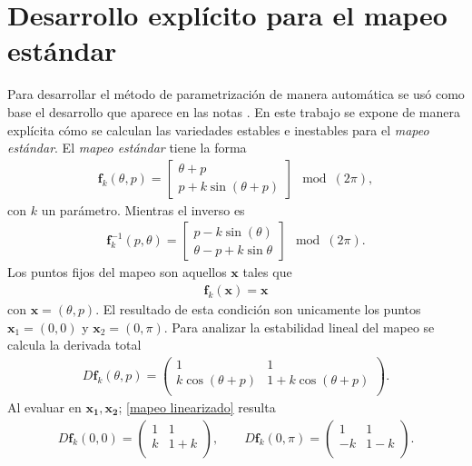 \section{Desarrollo explícito para el mapeo estándar}
Para desarrollar el método de parametrización de manera automática se usó como base el desarrollo que aparece en las notas \cite{Mireles}. En este trabajo se expone de manera explícita cómo se calculan las variedades estables e inestables para el \textit{mapeo estándar}. El \textit{mapeo estándar} tiene la forma \citep{devaney}
\begin{eqnarray}
\mathbf{f}_{k}(\theta,p) = \left[\begin{array}{c}
\theta + p \\
p + k\sin(\theta +p)
\end{array}\right] \mod(2\pi),  \label{mapeo estandar}
\end{eqnarray}
con $k$ un parámetro. Mientras el inverso es
\begin{eqnarray}
\mathbf{f}_{k}^{-1}(p,\theta) = \left[\begin{array}{c}
p  -k\sin(\theta) \\
\theta-p+k\sin{\theta}
\end{array}\right] \mod(2\pi). \label{mapeo estandar inverso}
\end{eqnarray}
Los puntos fijos del mapeo son aquellos $\mathbf{x}$ tales que 
\begin{eqnarray}
\mathbf{f}_{k}(\mathbf{x})=\mathbf{x} \label{ec puntos fijos}
\end{eqnarray}
con $\mathbf{x}=(\theta,p)$. El resultado de esta condición son unicamente los puntos $\mathbf{x}_{1}=(0,0)$ y $\mathbf{x}_{2}=(0,\pi)$. Para analizar la estabilidad lineal del mapeo se calcula la derivada total
\begin{eqnarray}
D\mathbf{f}_{k}(\theta,p)=\begin{pmatrix}
1 & 1 \\
k\cos(\theta+p)& 1+k\cos(\theta+p)\\ 
\end{pmatrix}.\label{mapeo linearizado}
\end{eqnarray}
Al evaluar en $\mathbf{x_{1}},\mathbf{x_{2}}$; \eqref{mapeo linearizado} resulta 
\begin{eqnarray}
D\mathbf{f}_{k}(0,0)=
\begin{pmatrix}
1 & 1\\
k & 1+k\\
\end{pmatrix}, \qquad D\mathbf{f}_{k}(0,\pi)= \begin{pmatrix}
1 & 1\\
-k & 1-k\\
\end{pmatrix}.
\end{eqnarray}
